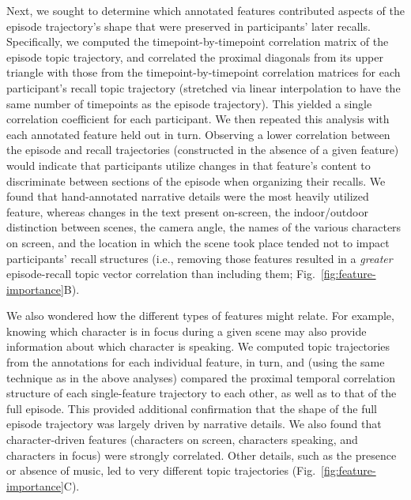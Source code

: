 \documentclass{article}
\begin{document}
Next, we sought to determine which annotated features contributed aspects of the episode trajectory's shape that were preserved in participants' later recalls.  Specifically, we computed the timepoint-by-timepoint correlation matrix of the episode topic trajectory, and correlated the proximal diagonals from its upper triangle with those from the timepoint-by-timepoint correlation matrices for each participant's recall topic trajectory (stretched via linear interpolation to have the same number of timepoints as the episode trajectory).  This yielded a single correlation coefficient for each participant.  We then repeated this analysis with each annotated feature held out in turn.  Observing a lower correlation between the episode and recall trajectories (constructed in the absence of a given feature) would indicate that participants utilize changes in that feature's content to discriminate between sections of the episode when organizing their recalls.  We found that hand-annotated narrative details were the most heavily utilized feature, whereas changes in the text present on-screen, the indoor/outdoor distinction between scenes, the camera angle, the names of the various characters on screen, and the location in which the scene took place tended not to impact participants' recall structures (i.e., removing those features resulted in a \textit{greater} episode-recall topic vector correlation than including them; Fig.~\ref{fig:feature-importance}B).

We also wondered how the different types of features might relate.  For example, knowing which character is in focus during a given scene may also provide information about which character is speaking.  We computed topic trajectories from the annotations for each individual feature, in turn, and (using the same technique as in the above analyses) compared the proximal temporal correlation structure of each single-feature trajectory to each other, as well as to that of the full episode.  This provided additional confirmation that the shape of the full episode trajectory was largely driven by narrative details.  We also found that character-driven features (characters on screen, characters speaking, and characters in focus) were strongly correlated.  Other details, such as the presence or absence of music, led to very different topic trajectories (Fig.~\ref{fig:feature-importance}C).
\end{document}

